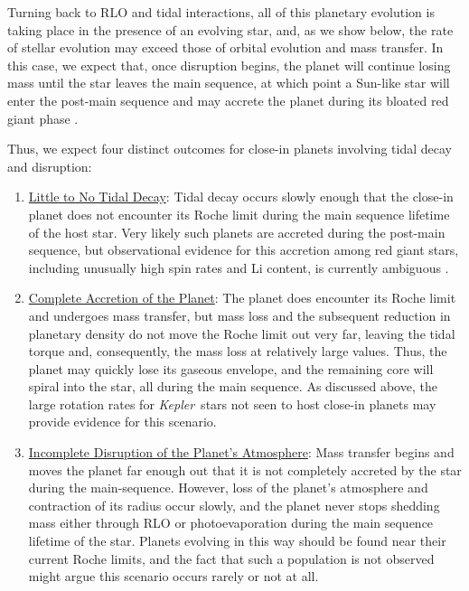\documentclass{svjour3}                     %
\newcommand{\kepler}{\emph{Kepler}}
\begin{document}
Turning back to RLO and tidal interactions, all of this planetary evolution is taking place in the presence of an evolving star, and, as we show below, the rate of stellar evolution may exceed those of orbital evolution and mass transfer. In this case, we expect that, once disruption begins, the planet will continue losing mass until the star leaves the main sequence, at which point a Sun-like star will enter the post-main sequence and may accrete the planet during its bloated red giant phase \cite{2009ApJ...700..832C}.

Thus, we expect four distinct outcomes for close-in planets involving tidal decay and disruption:
\begin{enumerate}
\item \underline{Little to No Tidal Decay}: Tidal decay occurs slowly enough that the close-in planet does not encounter its Roche limit during the main sequence lifetime of the host star. Very likely such planets are accreted during the post-main sequence, but observational evidence for this accretion among red giant stars, including unusually high spin rates and Li content, is currently ambiguous \cite{2012ApJ...757..109C}.

\item \underline{Complete Accretion of the Planet}: The planet does encounter its Roche limit and undergoes mass transfer, but mass loss and the subsequent reduction in planetary density do not move the Roche limit out very far, leaving the tidal torque and, consequently, the mass loss at relatively large values. Thus, the planet may quickly lose its gaseous envelope, and the remaining core will spiral into the star, all during the main sequence. As discussed above, the large rotation rates for \kepler\ stars not seen to host close-in planets \cite{2013ApJ...775L..11M} may provide evidence for this scenario.

\item \underline{Incomplete Disruption of the Planet's Atmosphere}: Mass transfer begins and moves the planet far enough out that it is not completely accreted by the star during the main-sequence. However, loss of the planet's atmosphere and contraction of its radius occur slowly, and the planet never stops shedding mass either through RLO or photoevaporation during the main sequence lifetime of the star. Planets evolving in this way should be found near their current Roche limits, and the fact that such a population is not observed might argue this scenario occurs rarely or not at all.


\end{enumerate}
\end{document}
